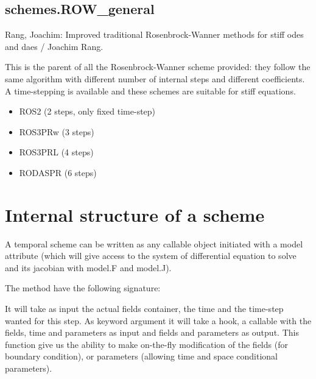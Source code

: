 \documentclass[letterpaper,10pt,english]{sphinxmanual}
\begin{document}
\subsection{schemes.ROW\_general}
\label{\detokenize{schemes:schemes-row-general}}
Rang, Joachim: Improved traditional Rosenbrock-Wanner methods for stiff odes and daes / Joachim Rang.

This is the parent of all the Rosenbrock-Wanner scheme provided: they follow the same algorithm with different number of internal steps and different coefficients. A time-stepping is available and these schemes are suitable for stiff equations.
\begin{itemize}
\item {} 
ROS2 (2 steps, only fixed time-step)

\item {} 
ROS3PRw (3 steps)

\item {} 
ROS3PRL (4 steps)

\item {} 
RODASPR (6 steps)

\end{itemize}


\section{Internal structure of a scheme}
\label{\detokenize{schemes:internal-structure-of-a-scheme}}
A temporal scheme can be written as any callable object initiated with a model attribute (which will give access to the system of differential equation to solve and its jacobian with model.F and model.J).

The  method have the following signature:

\begin{sphinxVerbatim}[commandchars=\\\{\}]
      
                        
\end{sphinxVerbatim}

It will take as input the actual fields container, the time and the time-step wanted for this step. As keyword argument it will take a hook, a callable with the fields, time and parameters as input and fields and parameters as output. This function give us the ability to make on-the-fly modification of the fields (for boundary condition), or parameters (allowing time and space conditional parameters).
\end{document}
